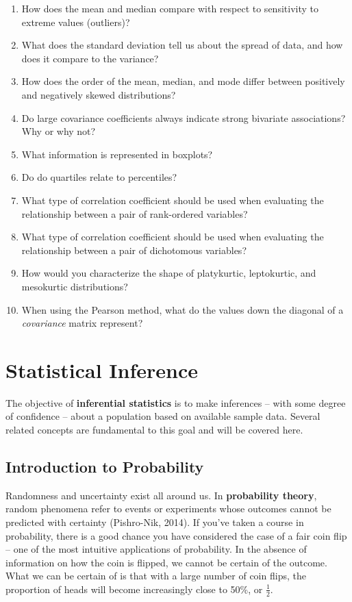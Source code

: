 \documentclass[]{book}
\begin{document}
\begin{enumerate}
\def\labelenumi{\arabic{enumi}.}
\item
  How does the mean and median compare with respect to sensitivity to extreme values (outliers)?
\item
  What does the standard deviation tell us about the spread of data, and how does it compare to the variance?
\item
  How does the order of the mean, median, and mode differ between positively and negatively skewed distributions?
\item
  Do large covariance coefficients always indicate strong bivariate associations? Why or why not?
\item
  What information is represented in boxplots?
\item
  Do do quartiles relate to percentiles?
\item
  What type of correlation coefficient should be used when evaluating the relationship between a pair of rank-ordered variables?
\item
  What type of correlation coefficient should be used when evaluating the relationship between a pair of dichotomous variables?
\item
  How would you characterize the shape of platykurtic, leptokurtic, and mesokurtic distributions?
\item
  When using the Pearson method, what do the values down the diagonal of a \emph{covariance} matrix represent?
\end{enumerate}

\hypertarget{inf-stats}{%
\chapter{Statistical Inference}\label{inf-stats}}

The objective of \textbf{inferential statistics} is to make inferences -- with some degree of confidence -- about a population based on available sample data. Several related concepts are fundamental to this goal and will be covered here.

\hypertarget{introduction-to-probability}{%
\section{Introduction to Probability}\label{introduction-to-probability}}

Randomness and uncertainty exist all around us. In \textbf{probability theory}, random phenomena refer to events or experiments whose outcomes cannot be predicted with certainty (Pishro-Nik, 2014). If you've taken a course in probability, there is a good chance you have considered the case of a fair coin flip -- one of the most intuitive applications of probability. In the absence of information on how the coin is flipped, we cannot be certain of the outcome. What we can be certain of is that with a large number of coin flips, the proportion of heads will become increasingly close to 50\%, or \(\frac{1}{2}\).
\end{document}
